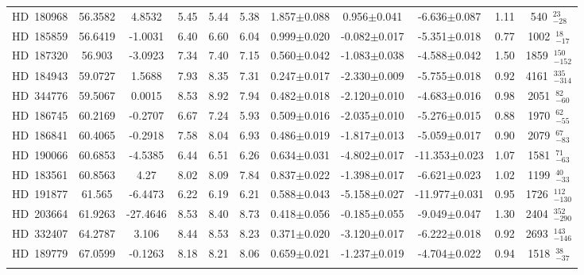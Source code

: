 {\begin{longtable}{lcccccccccc}
\noalign{\smallskip}
HD~180968 & 56.3582 & 4.8532 & 5.45 & 5.44 & 5.38 & 1.857$\pm$0.088 & 0.956$\pm$0.041 & -6.636$\pm$0.087 & 1.11 & 540~$_{-28}^{23}$ \\
\noalign{\smallskip}
HD~185859 & 56.6419 & -1.0031 & 6.40 & 6.60 & 6.04 & 0.999$\pm$0.020 & -0.082$\pm$0.017 & -5.351$\pm$0.018 & 0.77 & 1002~$_{-17}^{18}$ \\
\noalign{\smallskip}
HD~187320 & 56.903 & -3.0923 & 7.34 & 7.40 & 7.15 & 0.560$\pm$0.042 & -1.083$\pm$0.038 & -4.588$\pm$0.042 & 1.50 & 1859~$_{-152}^{150}$ \\
\noalign{\smallskip}
HD~184943 & 59.0727 & 1.5688 & 7.93 & 8.35 & 7.31 & 0.247$\pm$0.017 & -2.330$\pm$0.009 & -5.755$\pm$0.018 & 0.92 & 4161~$_{-314}^{335}$ \\
\noalign{\smallskip}
HD~344776 & 59.5067 & 0.0015 & 8.53 & 8.92 & 7.94 & 0.482$\pm$0.018 & -2.120$\pm$0.010 & -4.683$\pm$0.016 & 0.98 & 2051~$_{-60}^{82}$ \\
\noalign{\smallskip}
HD~186745 & 60.2169 & -0.2707 & 6.67 & 7.24 & 5.93 & 0.509$\pm$0.016 & -2.035$\pm$0.010 & -5.276$\pm$0.015 & 0.88 & 1970~$_{-55}^{62}$ \\
\noalign{\smallskip}
HD~186841 & 60.4065 & -0.2918 & 7.58 & 8.04 & 6.93 & 0.486$\pm$0.019 & -1.817$\pm$0.013 & -5.059$\pm$0.017 & 0.90 & 2079~$_{-83}^{67}$ \\
\noalign{\smallskip}
HD~190066 & 60.6853 & -4.5385 & 6.44 & 6.51 & 6.26 & 0.634$\pm$0.031 & -4.802$\pm$0.017 & -11.353$\pm$0.023 & 1.07 & 1581~$_{-63}^{71}$ \\
\noalign{\smallskip}
HD~183561 & 60.8563 & 4.27 & 8.02 & 8.09 & 7.84 & 0.837$\pm$0.022 & -1.398$\pm$0.017 & -6.621$\pm$0.023 & 1.02 & 1199~$_{-33}^{40}$ \\
\noalign{\smallskip}
HD~191877 & 61.565 & -6.4473 & 6.22 & 6.19 & 6.21 & 0.588$\pm$0.043 & -5.158$\pm$0.027 & -11.977$\pm$0.031 & 0.95 & 1726~$_{-130}^{112}$ \\
\noalign{\smallskip}
HD~203664 & 61.9263 & -27.4646 & 8.53 & 8.40 & 8.73 & 0.418$\pm$0.056 & -0.185$\pm$0.055 & -9.049$\pm$0.047 & 1.30 & 2404~$_{-290}^{352}$ \\
\noalign{\smallskip}
HD~332407 & 64.2787 & 3.106 & 8.44 & 8.53 & 8.23 & 0.371$\pm$0.020 & -3.120$\pm$0.017 & -6.222$\pm$0.018 & 0.92 & 2693~$_{-146}^{143}$ \\
\noalign{\smallskip}
HD~189779 & 67.0599 & -0.1263 & 8.18 & 8.21 & 8.06 & 0.659$\pm$0.021 & -1.237$\pm$0.019 & -4.704$\pm$0.022 & 0.94 & 1518~$_{-37}^{38}$ \\
\noalign{\smallskip}

\end{longtable}}
